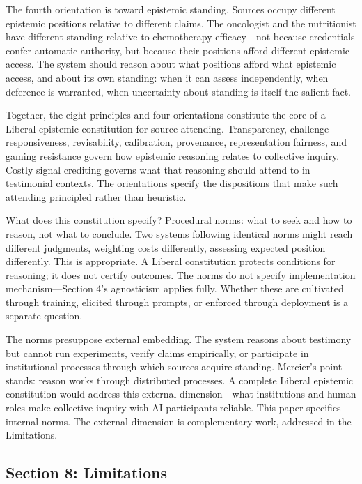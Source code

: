 The fourth orientation is toward epistemic standing. Sources occupy
different epistemic positions relative to different claims. The
oncologist and the nutritionist have different standing relative to
chemotherapy efficacy---not because credentials confer automatic
authority, but because their positions afford different epistemic
access. The system should reason about what positions afford what
epistemic access, and about its own standing: when it can assess
independently, when deference is warranted, when uncertainty about
standing is itself the salient fact.

Together, the eight principles and four orientations constitute the core
of a Liberal epistemic constitution for source-attending. Transparency,
challenge-responsiveness, revisability, calibration, provenance,
representation fairness, and gaming resistance govern how epistemic
reasoning relates to collective inquiry. Costly signal crediting governs
what that reasoning should attend to in testimonial contexts. The
orientations specify the dispositions that make such attending
principled rather than heuristic.

What does this constitution specify? Procedural norms: what to seek and
how to reason, not what to conclude. Two systems following identical
norms might reach different judgments, weighting costs differently,
assessing expected position differently. This is appropriate. A Liberal
constitution protects conditions for reasoning; it does not certify
outcomes. The norms do not specify implementation mechanism---Section
4's agnosticism applies fully. Whether these are cultivated through
training, elicited through prompts, or enforced through deployment is a
separate question.

The norms presuppose external embedding. The system reasons about
testimony but cannot run experiments, verify claims empirically, or
participate in institutional processes through which sources acquire
standing. Mercier's point stands: reason works through distributed
processes. A complete Liberal epistemic constitution would address this
external dimension---what institutions and human roles make collective
inquiry with AI participants reliable. This paper specifies internal
norms. The external dimension is complementary work, addressed in the
Limitations.

\subsection{Section 8: Limitations}\label{section-8-limitations}


